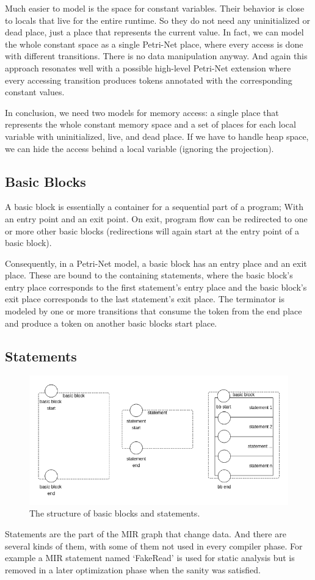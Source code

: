 Much easier to model is the space for constant variables.
Their behavior is close to locals that live for the entire runtime.
So they do not need any uninitialized or dead place, just a place that represents the current value.
In fact, we can model the whole constant space as a single Petri-Net place, where every access is done with different transitions.
There is no data manipulation anyway.
And again this approach resonates well with a possible high-level Petri-Net extension where every accessing transition produces tokens annotated with the corresponding constant values.

In conclusion, we need two models for memory access: a single place that represents the whole constant memory space and a set of places for each local variable with uninitialized, live, and dead place.
If we have to handle heap space, we can hide the access behind a local variable (ignoring the projection).

\subsection{Basic Blocks}
A basic block is essentially a container for a sequential part of a program; 
With an entry point and an exit point.
On exit, program flow can be redirected to one or more other basic blocks (redirections will again start at the entry point of a basic block).

Consequently, in a Petri-Net model, a basic block has an entry place and an exit place.
These are bound to the containing statements, where the basic block's entry place corresponds to the first statement's entry place and the basic block's exit place corresponds to the last statement's exit place.
The terminator is modeled by one or more transitions that consume the token from the end place and produce a token on another basic blocks start place.

\subsection{Statements}
\begin{figure}
    \centering
    \includegraphics[width=.9\textwidth]{../diagrams/basic_blocks.png}
    \caption{
        The structure of basic blocks and statements.
    }
    \label{basic_block_trans}
\end{figure}
Statements are the part of the MIR graph that change data.
And there are several kinds of them, with some of them not used in every compiler phase.
For example a MIR statement named `FakeRead' is used for static analysis but is removed in a later optimization phase when the sanity was satisfied.

